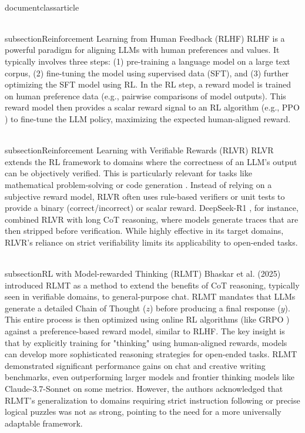 \\documentclass{article}
\begin{document}
\\subsection{Reinforcement Learning from Human Feedback (RLHF)}
RLHF \cite{christiano2017deep, ouyang2022training} is a powerful paradigm for aligning LLMs with human preferences and values. It typically involves three steps: (1) pre-training a language model on a large text corpus, (2) fine-tuning the model using supervised data (SFT), and (3) further optimizing the SFT model using RL. In the RL step, a reward model is trained on human preference data (e.g., pairwise comparisons of model outputs). This reward model then provides a scalar reward signal to an RL algorithm (e.g., PPO \cite{schulman2017proximal}) to fine-tune the LLM policy, maximizing the expected human-aligned reward.

\\subsection{Reinforcement Learning with Verifiable Rewards (RLVR)}
RLVR extends the RL framework to domains where the correctness of an LLM's output can be objectively verified. This is particularly relevant for tasks like mathematical problem-solving \cite{kazemnejad2025vineppo} or code generation \cite{deepseek2025deepseek}. Instead of relying on a subjective reward model, RLVR often uses rule-based verifiers or unit tests to provide a binary (correct/incorrect) or scalar reward. DeepSeek-R1 \cite{deepseek2025deepseek}, for instance, combined RLVR with long CoT reasoning, where models generate traces that are then stripped before verification. While highly effective in its target domains, RLVR's reliance on strict verifiability limits its applicability to open-ended tasks.

\\subsection{RL with Model-rewarded Thinking (RLMT)}
Bhaskar et al. (2025) introduced RLMT \cite{bhaskar2025language} as a method to extend the benefits of CoT reasoning, typically seen in verifiable domains, to general-purpose chat. RLMT mandates that LLMs generate a detailed Chain of Thought ($z$) before producing a final response ($y$). This entire process is then optimized using online RL algorithms (like GRPO \cite{shao2024deepseekmath}) against a preference-based reward model, similar to RLHF. The key insight is that by explicitly training for "thinking" using human-aligned rewards, models can develop more sophisticated reasoning strategies for open-ended tasks. RLMT demonstrated significant performance gains on chat and creative writing benchmarks, even outperforming larger models and frontier thinking models like Claude-3.7-Sonnet on some metrics. However, the authors acknowledged that RLMT's generalization to domains requiring strict instruction following or precise logical puzzles was not as strong, pointing to the need for a more universally adaptable framework.
\end{document}
